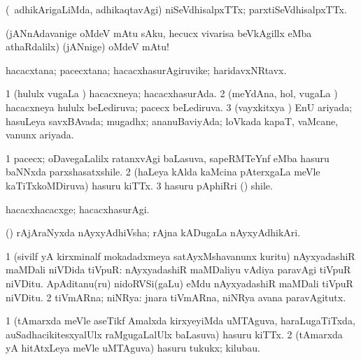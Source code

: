 {{\bentry
{} 
\gl{\gu}
\expl{\G\ }
\bmng
 (\kanmu\ adhikArigaLiMda, adhikaqtavAgi) niSeVdhisalpxTTx; parxtiSeVdhisalpxTTx. 
\emng
\eentry

\bentry
{} 
\gl{\BAavayx}
\expl{}
\bmng
 (jANnAdavanige oMdeV mAtu sAku, hecucx vivarisa beVkAgillx eMba athaRdalilx) (jANnige) oMdeV mAtu! 
\emng
\eentry

\bentry
{} 
\gl{\nA}
\expl{}
\bmng
 hacacxtana; pacecxtana; hacacxhasurAgiruvike; haridavxNRtavx. 
\emng
\eentry

\bentry
{} 
\gl{\gu}
\expl{}
\bmng
\bnum
\num{1} (hululx \mo vugaLa \vi) hacacxneya; hacacxhasurAda. 
\num{2} (meYdAna, hol, \mo vugaLa \vi) hacacxneya hululx beLediruva; pacecx beLediruva. 
\num{3} (vayxkitxya \vi) EnU ariyada; hasuLeya savxBAvada; mugadhx; ananuBaviyAda; loVkada kapaT, vaMcane, \mo vanunx ariyada. 
\enum
\emng
\eentry

\bentry
{} 
\gl{\nA}
\expl{}
\bmng
\bnum
\num{1} pacecx; oDavegaLalilx ratanxvAgi baLasuva, sapeRMTeYnf eMba hasuru baNNxda parxshasatxshile. 
\num{2} (haLeya kAlda kaMcina pAterxgaLa meVle kaTiTxkoMDiruva) hasuru kiTTx. 
\num{3} hasuru pAphiRri () shile. 
\enum
\emng
\eentry

\bentry
{} 
\gl{\kirxvi}
\expl{}
\bmng
 hacacxhacacxge; hacacxhasurAgi. 
\emng
\eentry

\bentry
{} 
\gl{\nA}
\expl{}
\bmng
 (\birx) rAjAraNyxda nAyxyAdhiVsha; rAjna kADugaLa nAyxyAdhikAri. 
\emng
\eentry

\bentry
{} 
\gl{\nA}
\expl{}
\bmng
\bnum
\num{1} (sivilf yA kirxminalf mokadadxmeya satAyxMshavanunx kuritu) nAyxyadashiR maMDali niVDida tiVpuR:  nAyxyadashiR maMDaliyu vAdiya paravAgi tiVpuR niVDitu.  ApAditanu(ru) nidoRVSi(gaLu) eMdu nAyxyadashiR maMDali tiVpuR niVDitu. 
\num{2} tiVmARna; niNRya:  jnara tiVmARna, niNRya avana paravAgitutx. 
\enum
\emng
\eentry

\bentry
{} 
\gl{\nA}
\expl{}
\bmng
\bnum
\num{1} (tAmarxda meVle aseTikf Amalxda kirxyeyiMda uMTAguva, haraLugaTiTxda, auSadhacikitesxyalUlx raMgugaLalUlx baLasuva) hasuru kiTTx. 
\num{2} (tAmarxda yA hitAtxLeya meVle uMTAguva) hasuru tukukx; kilubau. 
\enum
\emng
\eentry

}}
